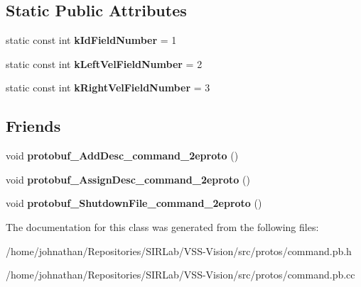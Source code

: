 \subsection*{Static Public Attributes}
\begin{DoxyCompactItemize}
\item 
static const int {\bfseries k\+Id\+Field\+Number} = 1\hypertarget{classvss__command_1_1Robot__Command_a72d358bc06840eb9b5835ad46cee4620}{}\label{classvss__command_1_1Robot__Command_a72d358bc06840eb9b5835ad46cee4620}

\item 
static const int {\bfseries k\+Left\+Vel\+Field\+Number} = 2\hypertarget{classvss__command_1_1Robot__Command_a834467a27672508216892c745d78bad4}{}\label{classvss__command_1_1Robot__Command_a834467a27672508216892c745d78bad4}

\item 
static const int {\bfseries k\+Right\+Vel\+Field\+Number} = 3\hypertarget{classvss__command_1_1Robot__Command_adb4e9f137218f7bf68ba93029e028e40}{}\label{classvss__command_1_1Robot__Command_adb4e9f137218f7bf68ba93029e028e40}

\end{DoxyCompactItemize}
\subsection*{Friends}
\begin{DoxyCompactItemize}
\item 
void {\bfseries protobuf\+\_\+\+Add\+Desc\+\_\+command\+\_\+2eproto} ()\hypertarget{classvss__command_1_1Robot__Command_a4825d92f856fcb4b02c67b601c433796}{}\label{classvss__command_1_1Robot__Command_a4825d92f856fcb4b02c67b601c433796}

\item 
void {\bfseries protobuf\+\_\+\+Assign\+Desc\+\_\+command\+\_\+2eproto} ()\hypertarget{classvss__command_1_1Robot__Command_a4c6fb97c25079d49daf010087d869100}{}\label{classvss__command_1_1Robot__Command_a4c6fb97c25079d49daf010087d869100}

\item 
void {\bfseries protobuf\+\_\+\+Shutdown\+File\+\_\+command\+\_\+2eproto} ()\hypertarget{classvss__command_1_1Robot__Command_a4cf10633ad46690f5eec6bdbbcf62de0}{}\label{classvss__command_1_1Robot__Command_a4cf10633ad46690f5eec6bdbbcf62de0}

\end{DoxyCompactItemize}


The documentation for this class was generated from the following files\+:\begin{DoxyCompactItemize}
\item 
/home/johnathan/\+Repositories/\+S\+I\+R\+Lab/\+V\+S\+S-\/\+Vision/src/protos/command.\+pb.\+h\item 
/home/johnathan/\+Repositories/\+S\+I\+R\+Lab/\+V\+S\+S-\/\+Vision/src/protos/command.\+pb.\+cc\end{DoxyCompactItemize}
